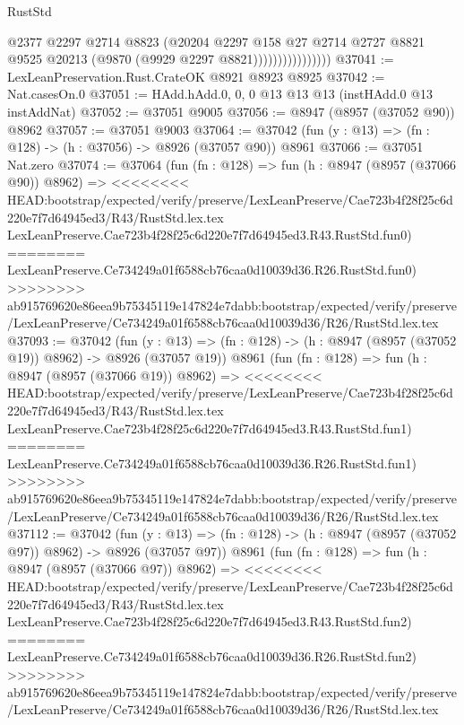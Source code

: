\begin{lexlean}{RustStd}
\begin{coremodule}
{\begin{coremodule}
{{{{{{{{{{{{{{{{{{{{{{{{{{{{{{{{{{{{{{{                              @2377
                              @2297
                              @2714
                              @8823
                              (@20204
                                @2297
                                @158
                                @27
                                @2714
                                @2727
                                @8821
                                @9525
                                @20213
                                (@9870 (@9929 @2297 @8821))))))))))))))))
@37041 := LexLeanPreservation.Rust.CrateOK @8921 @8923 @8925
@37042 := Nat.casesOn.{0}
@37051 := HAdd.hAdd.{0, 0, 0} @13 @13 @13 (instHAdd.{0} @13 instAddNat)
@37052 := @37051 @9005
@37056 := @8947 (@8957 (@37052 @90)) @8962
@37057 := @37051 @9003
@37064 := @37042 (fun (y : @13) => (fn : @128) -> (h : @37056) -> @8926 (@37057 @90)) @8961
@37066 := @37051 Nat.zero
@37074 := @37064
    (fun (fn : @128) =>
    fun (h : @8947 (@8957 (@37066 @90)) @8962) =>
<<<<<<<< HEAD:bootstrap/expected/verify/preserve/LexLeanPreserve/Cae723b4f28f25c6d220e7f7d64945ed3/R43/RustStd.lex.tex
    LexLeanPreserve.Cae723b4f28f25c6d220e7f7d64945ed3.R43.RustStd.fun0)
========
    LexLeanPreserve.Ce734249a01f6588cb76caa0d10039d36.R26.RustStd.fun0)
>>>>>>>> ab915769620e86eea9b75345119e147824e7dabb:bootstrap/expected/verify/preserve/LexLeanPreserve/Ce734249a01f6588cb76caa0d10039d36/R26/RustStd.lex.tex
@37093 := @37042
    (fun (y : @13) => (fn : @128) -> (h : @8947 (@8957 (@37052 @19)) @8962) -> @8926 (@37057 @19))
    @8961
    (fun (fn : @128) =>
    fun (h : @8947 (@8957 (@37066 @19)) @8962) =>
<<<<<<<< HEAD:bootstrap/expected/verify/preserve/LexLeanPreserve/Cae723b4f28f25c6d220e7f7d64945ed3/R43/RustStd.lex.tex
    LexLeanPreserve.Cae723b4f28f25c6d220e7f7d64945ed3.R43.RustStd.fun1)
========
    LexLeanPreserve.Ce734249a01f6588cb76caa0d10039d36.R26.RustStd.fun1)
>>>>>>>> ab915769620e86eea9b75345119e147824e7dabb:bootstrap/expected/verify/preserve/LexLeanPreserve/Ce734249a01f6588cb76caa0d10039d36/R26/RustStd.lex.tex
@37112 := @37042
    (fun (y : @13) => (fn : @128) -> (h : @8947 (@8957 (@37052 @97)) @8962) -> @8926 (@37057 @97))
    @8961
    (fun (fn : @128) =>
    fun (h : @8947 (@8957 (@37066 @97)) @8962) =>
<<<<<<<< HEAD:bootstrap/expected/verify/preserve/LexLeanPreserve/Cae723b4f28f25c6d220e7f7d64945ed3/R43/RustStd.lex.tex
    LexLeanPreserve.Cae723b4f28f25c6d220e7f7d64945ed3.R43.RustStd.fun2)
========
    LexLeanPreserve.Ce734249a01f6588cb76caa0d10039d36.R26.RustStd.fun2)
>>>>>>>> ab915769620e86eea9b75345119e147824e7dabb:bootstrap/expected/verify/preserve/LexLeanPreserve/Ce734249a01f6588cb76caa0d10039d36/R26/RustStd.lex.tex
}}}}}}}}}}}}}}}}}}}}}}}}}}}}}}}}}}}}}}}
\end{coremodule}}
\end{coremodule}
\end{lexlean}
